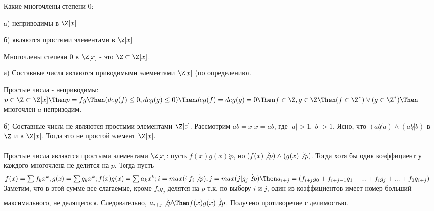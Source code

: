 \begin{problem} [23 (5.5)]
Какие многочлены степени 0:

a) неприводимы в $\Z[x]$

б) являются простыми элементами в $\Z[x]$
\end{problem}
\begin{solution}
Многочлены степени 0 в $\Z[x]$ - это $\Z \subset \Z[x]$.

а) Составные числа являются приводимыми элементами $\Z[x]$ (по определению).

Простые числа - неприводимы: $p \in \Z \subset \Z[x] \Then p = fg \Then (deg(f) \leq 0, deg(g) \leq 0) \Then deg(f) = deg(g) = 0 \Then f \in \Z, g \in \Z \Then (f \in \Z^*) \vee (g \in \Z^*) \Then$ многочлен $a$ неприводим.
 
б) Составные числа не являются простыми элементами $\Z[x]$. Рассмотрим $ab = x | x = ab$, где $|a| > 1, |b| > 1$. Ясно, что $(ab\not| a) \wedge (ab\not| b) $ в $\Z$ и в $\Z[x]$. Тогда это не простой элемент $\Z[x]$.

Простые числа являются простыми элементами $\Z[x]$: пусть $f(x)g(x) \vdots p$, но $(f(x) \not \vdots p) \wedge (g(x) \not \vdots p)$. Тогда хотя бы один коэффициент у каждого многочлена не делится на $p$. Тогда пусть $f(x) = \sum{f_k  x^k}, g(x) = \sum{g_k x^k}; f(x)g(x) = \sum{a_k x^k}; i = max(i | f_i \not\vdots p), j = max(j | g_j \not\vdots p) \Then 
a_{i+j} = (f_{i + j}g_0 + f_{i + j - 1}g_1 + ... + f_ig_j + ... + f_0g_{i + j})$ Заметим, что в этой сумме все слагаемые, кроме $f_ig_j$ делятся на $p$ т.к. по выбору $i$ и $j$, один из коэффициентов имеет номер больший максимального, не делящегося. Следовательно, $a_{i+j} \not\vdots p \Then f(x)g(x) \not\vdots p$. Получено противоречие с делимостью. 
\end{solution}

